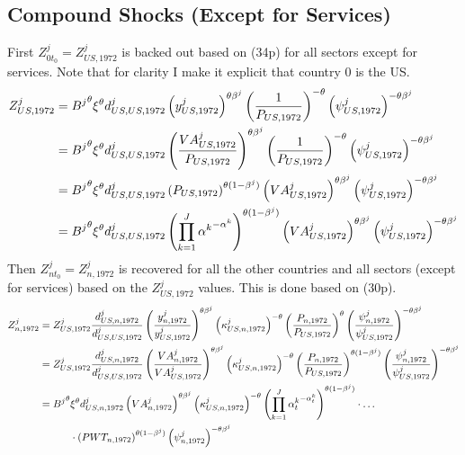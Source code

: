 \documentclass[11pt,oneside,a4paper]{article}
\begin{document}
\subsection{Compound Shocks (Except for Services)}
First $Z_{0t_0}^j = Z_{US, 1972}^{j}$ is backed out based on (34p) for all sectors except for services. Note that for clarity I make it explicit that country 0 is the US.
\begin{align}
Z_{US, 1972}^{j} &= {B^{j}}^{\theta } {\xi}^\theta d_{US, US, 1972}^{j} \left(y_{US, 1972}^{j}\right) ^{\theta \beta^{j}} \left(\frac{1}{P_{US, 1972}}\right) ^{-\theta} \left(\psi_{US, 1972}^{j}\right) ^{-\theta \beta^{j}} \notag\\
%
&= {B^{j}}^{\theta } {\xi}^\theta d_{US, US, 1972}^{j} \left(\frac{VA_{US, 1972}^j}{P_{US, 1972}}\right) ^{\theta \beta^{j}} \left(\frac{1}{P_{US, 1972}}\right) ^{-\theta} \left(\psi_{US, 1972}^{j}\right) ^{-\theta \beta^{j}}  \notag\\
%
&= {B^{j}}^{\theta } {\xi}^\theta d_{US, US, 1972}^{j} \left(P_{US, 1972}\right) ^{\theta (1 - \beta^{j})} \left(VA^j_{US, 1972}\right)^{\theta \beta^{j}} \left(\psi_{US, 1972}^{j}\right) ^{-\theta \beta^{j}}\notag\\
%
&= {B^{j}}^{\theta } {\xi}^\theta d_{US, US, 1972}^{j} \left(\prod_{k = 1}^J {\alpha^k}^{- \alpha^k}\right) ^{\theta(1 - \beta^{j})} \left(VA^j_{US, 1972}\right)^{\theta \beta^{j}} \left(\psi_{US, 1972}^{j}\right) ^{-\theta \beta^{j}}
\end{align}
%
Then $Z_{nt_0}^j = Z_{n, 1972}^j$ is recovered for all the other countries and all sectors (except for services) based on the $Z_{US, 1972}^{j}$ values. This is done based on (30p).
%
\begin{align}
Z_{n, 1972}^{j} &= Z_{US, 1972}^{j} \frac{d_{US, n, 1972}^{j}}{d_{US, US, 1972}^{j}} \left(\frac{y_{n, 1972}^{j}}{y_{US, 1972}^{j}}\right)^{\theta \beta ^{j}} \left(\kappa_{US, n, 1972}^{j}\right)^{-\theta} \left(\frac{P_{n, 1972}}{P_{US, 1972}}\right)^{\theta} \left(\frac{\psi_{n, 1972}^{j}}{\psi_{US, 1972}^{j}}\right)^{-\theta \beta^{j}} \notag\\
%
&= Z_{US, 1972}^{j} \frac{d_{US, n, 1972}^{j}}{d_{US, US, 1972}^{j}} \left(\frac{VA_{n, 1972}^{j}}{VA_{US, 1972}^{j}}\right)^{\theta \beta ^{j}} \left(\kappa_{US, n, 1972}^{j}\right)^{-\theta} \left(\frac{P_{n, 1972}}{P_{US, 1972}}\right)^{\theta(1 - \beta^j)} \left(\frac{\psi_{n, 1972}^{j}}{\psi_{US, 1972}^{j}}\right)^{-\theta \beta^{j}} \notag\\
%
&=  {B^{j}}^{\theta} {\xi}^\theta d_{US, n, 1972}^{j} \left(VA_{n, 1972}^{j}\right)^{\theta \beta ^{j}} \left(\kappa_{US, n, 1972}^{j}\right)^{-\theta} \left(\prod_{k = 1}^J {\alpha^k_t}^{- \alpha^k_t}\right) ^{\theta(1 - \beta^{j})} \cdot \dots \notag\\
& \qquad \quad \cdot \left(PWT_{n, 1972}\right)^{\theta(1 - \beta^j)} \left(\psi_{n, 1972}^{j}\right)^{-\theta \beta^{j}}
%
\end{align}
\end{document}
